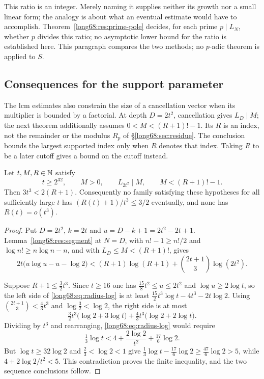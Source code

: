 \documentclass[11pt]{article}
\newcommand{\Ser}{S}
\newcommand{\Lc}{L}
\begin{document}
This ratio is an integer.  Merely naming it supplies neither its growth
nor a small linear form; the analogy is about what an eventual estimate
would have to accomplish.
Theorem~\ref{long68:res:prime-pole} decides, for each prime $p\mid\Lc_N$,
whether $p$ divides this ratio; no asymptotic lower bound for the ratio is
established here.  This paragraph compares the two methods; no $p$-adic
theorem is applied to $\Ser$.

\subsection{Consequences for the support parameter}\label{long68:sec:quantitative-support}

The lcm estimates also constrain the size of a cancellation vector
when its multiplier is bounded by a factorial. At depth $D=2t^2$,
cancellation gives $\Lc_D\mid M$; the next theorem additionally assumes
$0<M<(R+1)!-1$. Its $R$ is an index, not the remainder or the modulus
$R_p$ of \S\ref{long68:sec:residue}. The conclusion bounds the largest
supported index only when $R$ denotes that index. Taking $R$ to be a
later cutoff gives a bound on the cutoff instead.

\begin{samepage}
\label{long68:res:lead-channel-radius}
\begin{theorem}\label{long68:res:channel-radius}
Let $t,M,R\in\mathbb{N}$ satisfy
\[
 t\ge2^{32},\qquad M>0,\qquad \Lc_{2t^2}\mid M,\qquad M<(R+1)!-1 .
\]
Then $3t^3<2(R+1)$.  Consequently no family satisfying these hypotheses for
all sufficiently large $t$ has $(R(t)+1)/t^3\le3/2$ eventually, and none has
$R(t)=o(t^3)$.

\end{theorem}
\end{samepage}

\begin{proof}
Put $D=2t^2$, $k=2t$ and $u=D-k+1=2t^2-2t+1$.  Lemma~\ref{long68:res:segment} at
$N=D$, with $n!-1\ge n!/2$ and $\log n!\ge n\log n-n$, and with
$\Lc_D\le M<(R+1)!$, gives
\begin{equation}\label{long68:eq:radius-log}
 2t\bigl(u\log u-u-\log2\bigr)
 <(R+1)\log(R+1)+\binom{2t+1}{3}\log(2t^2).
\end{equation}


Suppose $R+1\le\tfrac32t^3$.  Since $t\ge16$ one has
$\tfrac{15}{8}t^2\le u\le2t^2$ and $\log u\ge2\log t$, so the left side of
\eqref{long68:eq:radius-log} is at least
$\tfrac{15}{2}t^3\log t-4t^3-2t\log2$.  Using
$\binom{2t+1}{3}<\tfrac43t^3$ and $\log\tfrac32<\log2$, the right side is at
most
\[
 \tfrac32t^3\bigl(\log2+3\log t\bigr)+\tfrac43t^3\bigl(\log2+2\log t\bigr).
\]
Dividing by $t^3$ and rearranging, \eqref{long68:eq:radius-log} would require
\[
 \tfrac13\log t<4+\frac{2\log2}{t^2}+\tfrac{17}6\log2 .
\]
But $\log t\ge32\log2$ and $\tfrac23<\log2<1$ give
$\tfrac13\log t-\tfrac{17}6\log2\ge\tfrac{47}6\log2>5$, while
$4+2\log2/t^2<5$.  This contradiction proves the finite inequality, and the
two sequence conclusions follow.
\end{proof}
\end{document}
